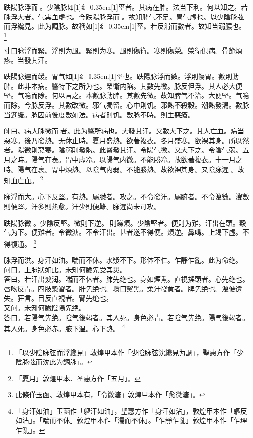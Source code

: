 \documentclass[oneside,b4paper]{ctexbook}
\begin{document}
\begin{flushleft}
趺陽脉浮而{𬈧}。少陰脉如{\hbox{\scalebox{0.68}[1]{纟}\kern-0.35em\scalebox{0.64}[1]{巠}}}者。其病在脾。法当下利。何以知之。若脉浮大者。气実血虛也。今趺陽脉浮而{𬈧}。故知脾气不足。胃气虛也。以少陰脉弦而浮纔見。此为調脉。故稱如{\hbox{\scalebox{0.68}[1]{纟}\kern-0.35em\scalebox{0.64}[1]{巠}}}。若反滑而數者。故知当溺膿也。
\footnote{「以少陰脉弦而浮纔見」敦煌甲本作「少陰脉弦沈纔見为調」，聖惠方作「少陰脉弦而沈此为調脉」。}

寸口脉浮而緊。浮則为風。緊則为寒。風則傷衛。寒則傷榮。榮衛俱病。骨節煩疼。当發其汗。

趺陽脉遲而缓。胃气如{\hbox{\scalebox{0.68}[1]{纟}\kern-0.35em\scalebox{0.64}[1]{巠}}}也。趺陽脉浮而數。浮則傷胃。數則動脾。此非本病。醫特下之所为也。榮衛内陷。其數先微。脉反但浮。其人必大便堅。气噫而除。何以言之。本數脉動脾。其數先微。故知脾气不治。大便堅。气噫而除。今脉反浮。其數改微。邪气獨留。心中則饥。邪熱不殺穀。潮熱發渴。數脉当遲缓。脉因前後度數如法。病者則饥。數脉不時。則生惡瘡。

師曰。病人脉微而{𬈧}者。此为醫所病也。大發其汗。又數大下之。其人亡血。病当惡寒。後乃發熱。无休止時。夏月盛熱。欲著複衣。冬月盛寒。欲裸其身。所以然者。陽微則惡寒。陰弱則發熱。此醫發其汗。令陽气微。又大下之。令陰气弱。五月之時。陽气在表。胃中虛冷。以陽气内微。不能勝冷。故欲著複衣。十一月之時。陽气在裏。胃中煩熱。以陰气内弱。不能勝熱。故欲裸其身。又陰脉遲{𬈧}。故知血亡血。
\footnote{「夏月」敦煌甲本、圣惠方作「五月」。}

脉浮而大。心下反堅。有熱。屬臓者。攻之。不令發汗。屬腑者。不令溲數。溲數則便堅。汗多則熱愈。汗少則便難。脉遲尚未可攻。

趺陽脉微{𬈧}。少陰反堅。微則下逆。{𬈧}則躁煩。少陰堅者。便則为難。汗出在頭。穀气为下。便難者。令微溏。不令汗出。甚者遂不得便。煩逆。鼻鳴。上竭下虛。不得復通。
\footnote{此條僅玉函、敦煌甲本有，「令微溏」敦煌甲本作「愈微溏」。}

脉浮而洪。身汗如油。喘而不休。水漿不下。形体不仁。乍靜乍亂。此为命绝。\\
问曰。上脉狀如此。未知何臓先受其災。\\
答曰。若汗出髮润。喘而不休者。肺先绝也。身如煙熏。直視搖頭者。心先绝也。唇吻反青。四肢漐習者。肝先绝也。環口黧黑。柔汗發黄者。脾先绝也。溲便遺失。狂言。目反直視者。腎先绝也。\\
又问。未知何臓陰陽先绝。\\
答曰。若陽气先绝。陰气後竭者。其人死。身色必青。若陰气先绝。陽气後竭者。其人死。身色必赤。腋下温。心下熱。
\footnote{「身汗如油」玉函作「軀汗如油」，聖惠方作「身汗如沾」，敦煌甲本作「軀反如沾」。「喘而不休」敦煌甲本作「濡而不休」。「乍靜乍亂」敦煌甲本作「乍理乍亂」。}


\end{flushleft}
\end{document}
